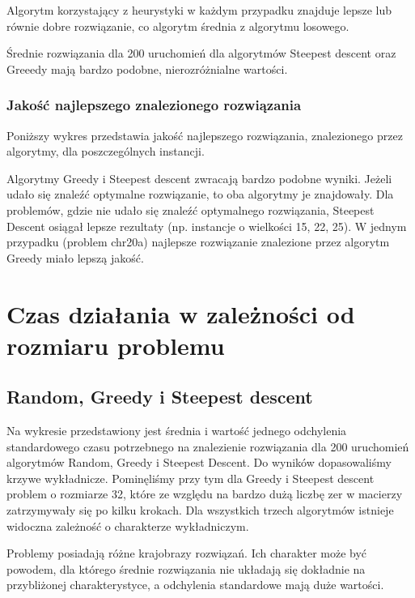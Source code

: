 \documentclass[a4paper,10pt]{article}
\begin{document}
Algorytm korzystający z heurystyki w każdym przypadku znajduje lepsze lub równie dobre rozwiązanie, co algorytm średnia z algorytmu losowego.

Średnie rozwiązania dla 200 uruchomień dla algorytmów Steepest descent oraz Greeedy mają bardzo podobne, nierozróżnialne wartości.

\subsubsection{Jakość najlepszego znalezionego rozwiązania}
Poniższy wykres przedstawia jakość najlepszego rozwiązania, znalezionego przez algorytmy, dla poszczególnych instancji.
\begin{center}

\end{center}
Algorytmy Greedy i Steepest descent zwracają bardzo podobne wyniki.
Jeżeli udało się znaleźć optymalne rozwiązanie, to oba algorytmy je znajdowały.
Dla problemów, gdzie nie udało się znaleźć optymalnego rozwiązania, Steepest Descent osiągał lepsze rezultaty (np. instancje o wielkości 15, 22, 25).
W jednym przypadku (problem chr20a) najlepsze rozwiązanie znalezione przez algorytm Greedy miało lepszą jakość. 

\section{Czas działania w zależności od rozmiaru problemu}
\subsection{Random, Greedy i Steepest descent}
Na wykresie przedstawiony jest średnia i wartość jednego odchylenia standardowego czasu potrzebnego na znalezienie rozwiązania dla 200 uruchomień algorytmów Random, Greedy i Steepest Descent.
Do wyników dopasowaliśmy krzywe wykładnicze.
Pominęliśmy przy tym dla Greedy i Steepest descent problem o rozmiarze 32, które ze względu na bardzo dużą liczbę zer w macierzy zatrzymywały się po kilku krokach.
Dla wszystkich trzech algorytmów istnieje widoczna zależność o charakterze wykładniczym.

Problemy posiadają różne krajobrazy rozwiązań.
Ich charakter może być powodem, dla którego średnie rozwiązania nie układają się dokładnie na przybliżonej charakterystyce, a odchylenia standardowe mają duże wartości.
\begin{center}

\end{center}
\end{document}
